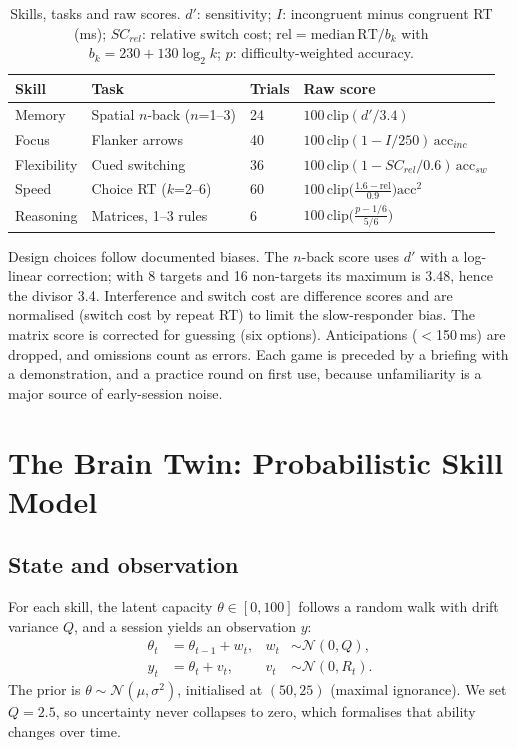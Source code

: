 \documentclass[conference]{IEEEtran}
\begin{document}
\begin{table}[t]
\caption{Skills, tasks and raw scores. $d'$: sensitivity; $I$: incongruent minus congruent RT (ms); $SC_{rel}$: relative switch cost; $\mathrm{rel}=\mathrm{median\,RT}/b_k$ with $b_k=230+130\log_2 k$; $p$: difficulty-weighted accuracy.}
\label{tab:tasks}
\centering\scriptsize
\setlength{\tabcolsep}{2pt}
\begin{tabular}{@{}p{1.15cm}p{1.45cm}p{0.9cm}p{3.6cm}@{}}
\toprule
Skill & Task & Trials & Raw score \\
\midrule
Memory & Spatial $n$-back ($n$=1--3) & 24 & $100\,\mathrm{clip}(d'/3.4)$ \\
Focus & Flanker arrows & 40 & $100\,\mathrm{clip}(1-I/250)\,\mathrm{acc}_{inc}$ \\
Flexibility & Cued switching & 36 & $100\,\mathrm{clip}(1-SC_{rel}/0.6)\,\mathrm{acc}_{sw}$ \\
Speed & Choice RT ($k$=2--6) & 60 & $100\,\mathrm{clip}\!\big(\tfrac{1.6-\mathrm{rel}}{0.9}\big)\mathrm{acc}^2$ \\
Reasoning & Matrices, 1--3 rules & 6 & $100\,\mathrm{clip}\!\big(\tfrac{p-1/6}{5/6}\big)$ \\
\bottomrule
\end{tabular}
\end{table}

Design choices follow documented biases. The $n$-back score uses $d'$ with a log-linear correction; with 8 targets and 16 non-targets its maximum is 3.48, hence the divisor 3.4. Interference and switch cost are difference scores and are normalised (switch cost by repeat RT) to limit the slow-responder bias. The matrix score is corrected for guessing (six options). Anticipations ($<$150\,ms) are dropped, and omissions count as errors. Each game is preceded by a briefing with a demonstration, and a practice round on first use, because unfamiliarity is a major source of early-session noise.

\section{The Brain Twin: Probabilistic Skill Model}\label{sec:twin}
\subsection{State and observation}
For each skill, the latent capacity $\theta\in[0,100]$ follows a random walk with drift variance $Q$, and a session yields an observation $y$:
\begin{align}
\theta_t&=\theta_{t-1}+w_t,& w_t&\sim\mathcal N(0,Q),\\
y_t&=\theta_t+v_t,& v_t&\sim\mathcal N(0,R_t).
\end{align}
The prior is $\theta\sim\mathcal N(\mu,\sigma^2)$, initialised at $(50,25)$ (maximal ignorance). We set $Q=2.5$, so uncertainty never collapses to zero, which formalises that ability changes over time.
\end{document}
